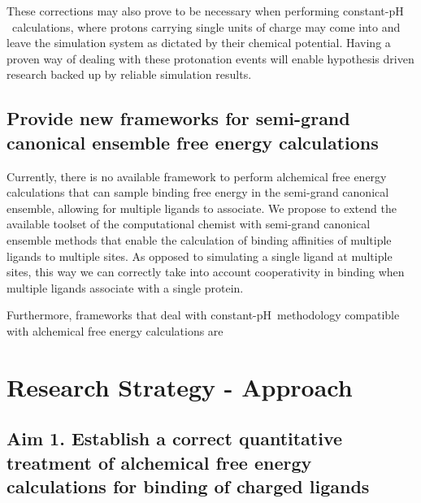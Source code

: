 \documentclass[10pt,final]{article}
\newif\ifinstr
\newcommand{\instr}[1]{\ifdraft{\ifinstr {\color{cyan}\emph{#1}} \fi}{}}
\newcommand{\pH}{p$\mathrm{H}$\ }
\begin{document}
These corrections may also prove to be necessary when performing constant-\pH calculations, where protons carrying single units of charge may come into and leave the simulation system as dictated by their chemical potential. Having a proven way of dealing with these protonation events will enable hypothesis driven research backed up by reliable simulation results.


\subsection*{Provide new frameworks for semi-grand canonical ensemble free energy calculations}
Currently, there is no available framework to perform alchemical free energy calculations that can sample binding free energy in the semi-grand canonical ensemble, allowing for multiple ligands to associate. We propose to extend the available toolset of the computational chemist with semi-grand canonical ensemble methods that enable the calculation of binding affinities of multiple ligands to multiple sites. As opposed to simulating a single ligand at multiple sites, this way we can correctly take into account cooperativity in binding when multiple ligands associate with a single protein.

Furthermore, frameworks that deal with constant-\pH methodology compatible with alchemical free energy calculations are 


\section*{Research Strategy - Approach}
\instr{Approach: More specific background information. Describe in detail the experimental design and research methods to be used. Technical hurdles to be overcome should be mentioned. Alternative approaches should be given for experiments that may not be feasible. Discussion of expected or possible results and their interpretation. Best format for each specific aim: a) rationale, b) methods, c) expected results, d) alternatives. Theory aims should follow a similar structure where possible.}



\subsection*{Aim 1. Establish a correct quantitative treatment of alchemical free energy calculations for binding of charged ligands}
\end{document}
